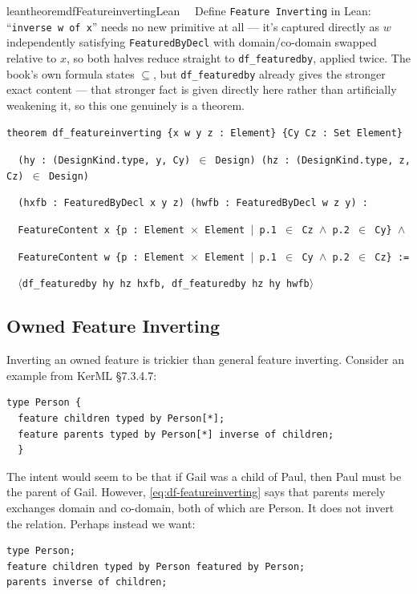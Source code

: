 \begin{restatable}{leantheorem}{dfFeatureinvertingLean}~~ Define \texttt{Feature
Inverting} in Lean: ``\texttt{inverse w of x}'' needs no new primitive at all --- it's captured directly as
$w$ independently satisfying \texttt{FeaturedByDecl} with domain/co-domain swapped relative to $x$, so both
halves reduce straight to \texttt{df\_featuredby}, applied twice. The book's own formula states $\subseteq$,
but \texttt{df\_featuredby} already gives the stronger exact content --- that stronger fact is given directly
here rather than artificially weakening it, so this one genuinely is a theorem.

\texttt{\textcolor{leancolor}{theorem} \textcolor{leanyellow}{df\_featureinverting} \{x w y z : Element\} \{Cy Cz : Set Element\}}

\texttt{~~(hy : (DesignKind.type, y, Cy) $\in$ Design) (hz : (DesignKind.type, z, Cz) $\in$ Design)}

\texttt{~~(hxfb : FeaturedByDecl x y z) (hwfb : FeaturedByDecl w z y) :}

\texttt{~~FeatureContent x \{p : Element $\times$ Element $\vert$ p.1 $\in$ Cz $\wedge$ p.2 $\in$ Cy\} $\wedge$}

\texttt{~~FeatureContent w \{p : Element $\times$ Element $\vert$ p.1 $\in$ Cy $\wedge$ p.2 $\in$ Cz\} :=}

\texttt{~~$\langle$df\_featuredby hy hz hxfb, df\_featuredby hz hy hwfb$\rangle$}
\label{df_featureinverting}
\end{restatable}

\subsection{Owned Feature Inverting}  

\pn Inverting an owned feature is trickier than general feature inverting.  Consider an example from KerML \S7.3.4.7:
\begin{lstlisting}
type Person {
  feature children typed by Person[*];
  feature parents typed by Person[*] inverse of children;
  }
\end{lstlisting}
\pn The intent would seem to be that if Gail was a child of Paul, then Paul must be the parent of Gail.  However, \ref{eq:df-featureinverting}
says that parents merely exchanges domain and co-domain, both of which are Person.  It does not invert the relation.  Perhaps instead we want:
\begin{lstlisting}
type Person; 
feature children typed by Person featured by Person;
parents inverse of children;
\end{lstlisting}





